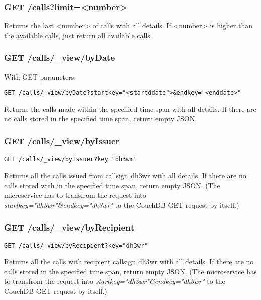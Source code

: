 \subsubsection{GET /calls?limit=<number>}

Returns the last <number> of calls with all details. If <number> is higher than the available calls, just return all available calls.

\subsubsection{GET /calls/\_view/byDate}
With GET parameters:

\begin{verbatim}
GET /calls/_view/byDate?startkey="<startddate">&endkey="<enddate>"
\end{verbatim}

Returns the calls made within the specified time span with all details. If there are no calls stored in the specified time span, return empty JSON.

\subsubsection{GET /calls/\_view/byIssuer}
\begin{verbatim}
GET /calls/_view/byIssuer?key="dh3wr"
\end{verbatim}

Returns all the calls issued from callsign dh3wr with all details. If there are no calls stored with in the specified time span, return empty JSON. (The microservice has to transfrom the request into \textit{startkey="dh3wr"\&endkey="dh3wr"} to the CouchDB GET request by itself.)

\subsubsection{GET /calls/\_view/byRecipient}
\begin{verbatim}
GET /calls/_view/byRecipient?key="dh3wr"
\end{verbatim}

Returns all the calls with recipient callsign dh3wr with all details. If there are no calls stored in the specified time span, return empty JSON. (The microservice has to transfrom the request into \textit{startkey="dh3wr"\&endkey="dh3wr"} to the CouchDB GET request by itself.)



